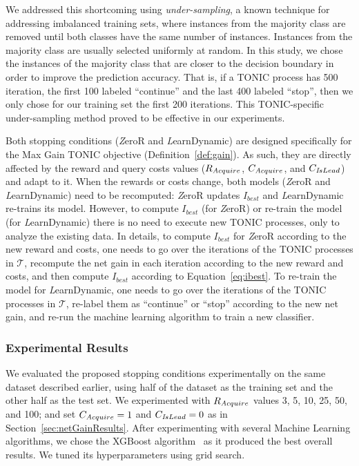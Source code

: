 \documentclass[journal]{IEEEtran}
\newcommand{\learnFixed}{{\textit ZeroR}}
\newcommand{\learnDynamic}{{\textit LearnDynamic}}
\newcommand{\IsLead}[1]{{\textit IsLead}}
\newcommand{\Acquire}{{\textit Acquire}}
\begin{document}
We addressed this shortcoming using \emph{under-sampling}, a known technique for addressing imbalanced training sets, where instances from the majority class are removed until both classes have the same number of instances. 
Instances from the majority class are usually  selected uniformly at random. 
In this study, we chose the instances of the majority class that are closer to the decision boundary in order to improve the prediction accuracy. 
That is, if a TONIC process has 500 iteration, the first 100 labeled ``continue'' and the last 400 labeled ``stop'', then we only chose for our training set the first 200 iterations. 
This TONIC-specific under-sampling method proved to be effective in our experiments. 


Both stopping conditions (\learnFixed{} and \learnDynamic{}) are designed specifically for the Max Gain TONIC objective (Definition~\ref{def:gain}). 
As such, they are directly affected by the reward and query costs values ($R_{\Acquire{}}$, $C_{\Acquire{}}$, and $C_{\IsLead{}}$) and adapt to it.  
When the rewards or costs change, both models (\learnFixed{} and \learnDynamic{}) need to be recomputed: \learnFixed{} updates $I_{best}$ and \learnDynamic{} re-trains its model. 
However, to compute $I_{best}$ (for \learnFixed{}) or re-train the model (for \learnDynamic{}) there is no need to execute new TONIC processes, only to analyze the existing data. In details, to compute $I_{best}$ for \learnFixed{} according to the new reward and costs, one needs to go over the iterations of the TONIC processes in $\mathcal{T}$, 
recompute the net gain in each iteration according to the new reward and costs, 
and then compute $I_{best}$ according to Equation~\ref{eq:ibest}. 
To re-train the model for \learnDynamic{}, one needs to go over the iterations of the TONIC processes in $\mathcal{T}$, 
re-label them as ``continue'' or ``stop'' according to the new net gain, and re-run the machine learning algorithm to train a new classifier. 



\subsubsection{Experimental Results}
We evaluated the proposed stopping conditions experimentally on the same dataset described earlier, using half of the dataset as the training set 
and the other half as the test set. 
We experimented with $R_{\Acquire{}}$ values 3, 5, 10, 25, 50, and 100; and set $C_{\Acquire{}}=1$ and $C_{\IsLead{}}=0$ as in Section~\ref{sec:netGainResults}. 
After experimenting with several Machine Learning algorithms, we chose the 
XGBoost algorithm~\cite{chen2016xgboost} as it produced the best overall results. 
We tuned its hyperparameters using grid search. %
\end{document}
